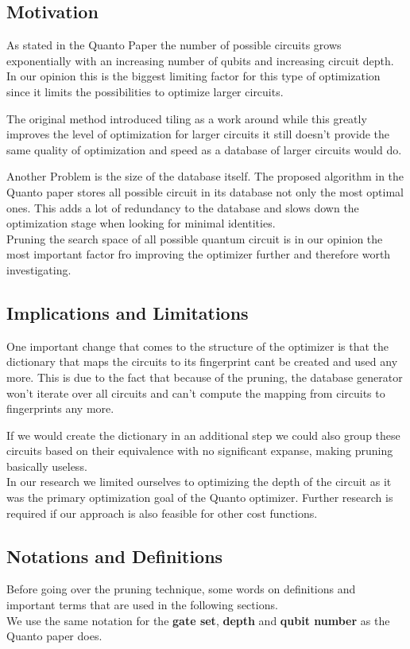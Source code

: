 \subsection{Motivation}
As stated in the Quanto Paper the number of possible circuits grows exponentially with an increasing number of qubits and
increasing circuit depth. In our opinion this is the biggest limiting factor for this type of optimization since it limits the possibilities to optimize larger circuits.

The original method introduced tiling as a work around while this greatly improves the level of optimization for larger circuits it still doesn't provide the same
quality of optimization and speed as a database of larger circuits would do. 

Another Problem is the size of the database itself. The proposed algorithm in the Quanto paper stores all possible circuit in its database not only the most optimal ones. This adds a lot of redundancy to the database and slows down the optimization stage when looking for minimal identities.\\

Pruning the search space of all possible quantum circuit is in our opinion the most important factor fro improving the optimizer further and therefore worth investigating. 

\subsection{Implications and Limitations}
One important change that comes to the structure of the optimizer is that the dictionary that maps the circuits to its fingerprint cant be created and used any more. This is due to the fact that because of the pruning, the database generator won't iterate over all circuits and can't compute the mapping from circuits to fingerprints any more.

If we would create the dictionary in an additional step we could also group these circuits based on their equivalence with no significant expanse, making pruning basically useless.\\

In our research we limited ourselves to optimizing the depth of the circuit as it was the primary optimization goal of the Quanto optimizer. Further research is required if our approach is also feasible for other cost functions.

\subsection{Notations and Definitions}
Before going over the pruning technique, some words on definitions and important terms that are used in the following sections.\\
We use the same notation for the \textbf{gate set}, \textbf{depth} and \textbf{qubit number} as the Quanto paper does. 

